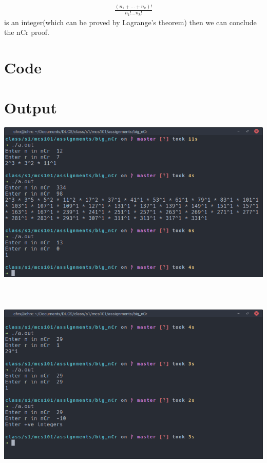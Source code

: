 \documentclass{article}
\begin{document}
\begin{align*}
     \frac{(n_1 + ... + n_k)!}{n_1!...n_k!}
\end{align*}
is an integer(which can be proved by Lagrange's theorem)
then we can conclude the nCr proof. 

\section{Code}



\vspace{2em}

\section{Output}
\vspace{2em}
\includegraphics[width = \textwidth]{sc1.png} \\\\ \\\\
\includegraphics[width = \textwidth]{sc2.png}
\end{document}
